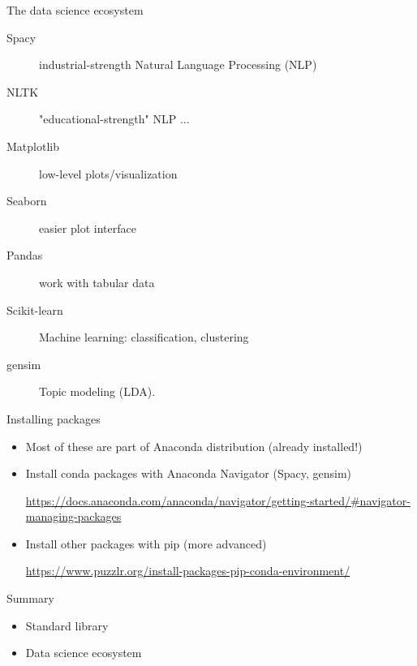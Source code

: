 \documentclass[aspectratio=169,usenames,dvipsnames]{beamer}
\begin{document}

\begin{frame}[fragile]{The data science ecosystem}
    \begin{description}
        \item[Spacy] industrial-strength Natural Language Processing (NLP)
        \item[NLTK] "educational-strength" NLP ...
        \item[Matplotlib] low-level plots/visualization
        \item[Seaborn] easier plot interface
        \item[Pandas] work with tabular data
        \item[Scikit-learn] Machine learning: classification, clustering
        \item[gensim] Topic modeling (LDA).
    \end{description}
\end{frame}

\begin{frame}{Installing packages}
    \begin{itemize}
        \item Most of these are part of Anaconda distribution (already installed!)
        \item Install conda packages with Anaconda Navigator (Spacy, gensim)

            \url{https://docs.anaconda.com/anaconda/navigator/getting-started/#navigator-managing-packages}

        \item Install other packages with pip (more advanced)

            \url{https://www.puzzlr.org/install-packages-pip-conda-environment/}
    \end{itemize}
\end{frame}


\begin{frame}{Summary}
    \begin{itemize}
        \item Standard library
        \item Data science ecosystem
    \end{itemize}
\end{frame}
\end{document}
